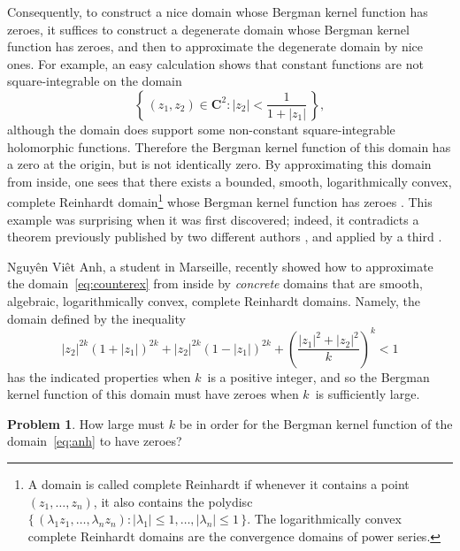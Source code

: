 \documentclass[12pt]{amsart}
\theoremstyle{definition}
\newtheorem{problem}{Problem}
\begin{document}
Consequently, to construct a nice domain whose Bergman kernel
function has zeroes, it suffices to construct a degenerate domain
whose Bergman kernel function has zeroes, and then to approximate
the degenerate domain by nice ones. For example, an easy
calculation shows that constant functions are not
square-integrable on the domain
\begin{equation}
\label{eq:counterex}
  \left\{\, (z_1,z_2)\in\mathbf{C}^2: |z_2|<\frac{1}{1+|z_1|}\,
\right\},
\end{equation}
although the domain does support some non-constant
square-integrable holomorphic functions. Therefore the Bergman
kernel function of this domain has a zero at the origin, but is
not identically zero.  By approximating this domain from inside,
one sees that there exists a bounded, smooth, logarithmically
convex, complete Reinhardt domain\footnote{A domain is called
  complete Reinhardt if whenever it contains a point
  \((z_1,\dotsc,z_n)\), it also contains the polydisc
  \(\{\,(\lambda_1z_1, \dotsc, \lambda_nz_n): |\lambda_1|\le1,
  \dotsc, |\lambda_n|\le1\,\}\). The logarithmically convex
  complete Reinhardt domains are the convergence domains of power
  series.}  whose Bergman kernel function has zeroes
\cite{boascounterexample}.  This example was surprising when it
was first discovered; indeed, it contradicts a theorem previously
published by two different authors \cite[Theorem~1]{matsuura},
\cite[Corollary]{kakurai} and applied by a third \cite{kanemaru}.

Nguy\^en Vi\^et Anh, a student in Marseille, recently showed
\cite{anh} how to approximate the domain~\eqref{eq:counterex}
from inside by \emph{concrete} domains that are smooth,
algebraic, logarithmically convex, complete Reinhardt domains.
Namely, the domain defined by the inequality
\begin{equation}
\label{eq:anh}
  |z_2|^{2k}(1+|z_1|)^{2k} + |z_2|^{2k}(1-|z_1|)^{2k} + \left(
  \frac{|z_1|^2+|z_2|^2} {k}\right)^k <1
\end{equation}
has the indicated properties when \(k\)~is a positive integer,
and so the Bergman kernel function of this domain must have
zeroes when \(k\)~is sufficiently large.

\begin{problem}
  How large must \(k\) be in order for the Bergman kernel
  function of the domain~\eqref{eq:anh} to have zeroes?
\end{problem}
\end{document}

